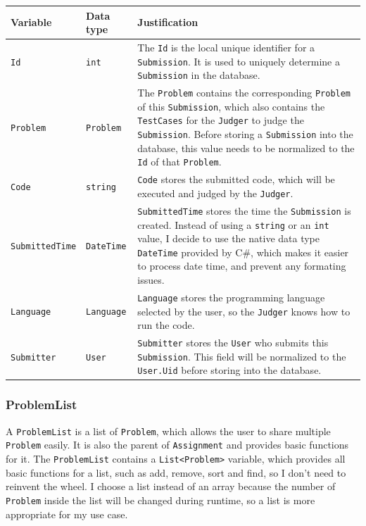 \documentclass[a4paper]{report}
\newcommand{\code}{\texttt}
\begin{document}
\begin{tabulary}{\textwidth}{|l|l|L|}
    \hline
    Variable & Data type & Justification \\
    \hline
    \code{Id} & \code{int} & The \code{Id} is the local unique identifier for a \code{Submission}. It is used to uniquely determine a \code{Submission} in the database. \\
    \hline
    \code{Problem} & \code{Problem} & The \code{Problem} contains the corresponding \code{Problem} of this \code{Submission}, which also contains the \code{TestCases} for the \code{Judger} to judge the \code{Submission}. Before storing a \code{Submission} into the database, this value needs to be normalized to the \code{Id} of that \code{Problem}. \\
    \hline
    \code{Code} & \code{string} & \code{Code} stores the submitted code, which will be executed and judged by the \code{Judger}. \\
    \hline
    \code{SubmittedTime} & \code{DateTime} & \code{SubmittedTime} stores the time the \code{Submission} is created. Instead of using a \code{string} or an \code{int} value, I decide to use the native data type \code{DateTime} provided by C\#, which makes it easier to process date time, and prevent any formating issues. \\
    \hline
    \code{Language} & \code{Language} & \code{Language} stores the programming language selected by the user, so the \code{Judger} knows how to run the code.\\
    \hline
    \code{Submitter} & \code{User} & \code{Submitter} stores the \code{User} who submits this \code{Submission}. This field will be normalized to the \code{User.Uid} before storing into the database. \\
    \hline
\end{tabulary}

\subsubsection{ProblemList}

A \code{ProblemList} is a list of \code{Problem}, which allows the user to share multiple \code{Problem} easily. It is also the parent of \code{Assignment} and provides basic functions for it. The \code{ProblemList} contains a \code{List<Problem>} variable, which provides all basic functions for a list, such as add, remove, sort and find, so I don't need to reinvent the wheel. I choose a list instead of an array because the number of \code{Problem} inside the list will be changed during runtime, so a list is more appropriate for my use case.
\end{document}

